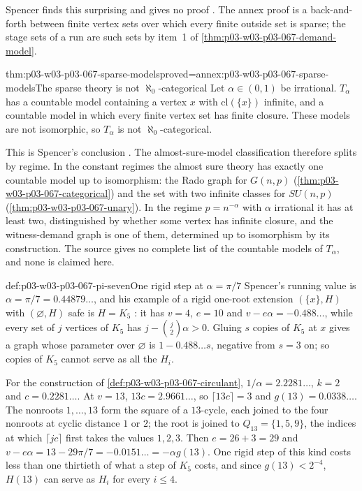 Spencer finds this surprising and gives no proof
\cite[p.~14]{Spencer2007LogicRandomStructuresAuthor}.  The annex proof is a
back-and-forth between finite vertex sets over which every finite outside
set is sparse; the stage sets of a run are such sets by item~1 of
\cref{thm:p03-w03-p03-067-demand-model}.

\begin{hbcorollary}{thm:p03-w03-p03-067-sparse-models}{proved=annex:p03-w03-p03-067-sparse-models}{The sparse theory is not \(\aleph_0\)-categorical}
Let \(\alpha\in(0,1)\) be irrational.  \(T_\alpha\) has a countable model
containing a vertex \(x\) with \(\mathrm{cl}(\{x\})\) infinite, and a
countable model in which every finite vertex set has finite closure.  These
models are not isomorphic, so \(T_\alpha\) is not \(\aleph_0\)-categorical.
\end{hbcorollary}

This is Spencer's conclusion \cite[p.~15]{Spencer2007LogicRandomStructuresAuthor}.
The almost-sure-model classification therefore splits by regime.  In the
constant regimes the almost sure theory has exactly one countable model up
to isomorphism: the Rado graph for \(G(n,p)\)
(\cref{thm:p03-w03-p03-067-categorical}) and the set with two infinite
classes for \(SU(n,p)\) (\cref{thm:p03-w03-p03-067-unary}).  In the regime
\(p=n^{-\alpha}\) with \(\alpha\) irrational it has at least two,
distinguished by whether some vertex has infinite closure, and the
witness-demand graph is one of them, determined up to isomorphism by its
construction.  The source gives no complete list of the countable models of
\(T_\alpha\), and none is claimed here.

\begin{hbexample}{def:p03-w03-p03-067-pi-seven}{One rigid step at \(\alpha=\pi/7\)}
Spencer's running value is \(\alpha=\pi/7=0.44879\ldots\), and his example of
a rigid one-root extension \((\{x\},H)\) with \((\varnothing,H)\) safe is
\(H=K_5\) \cite[p.~14]{Spencer2007LogicRandomStructuresAuthor}: it has
\(v=4\), \(e=10\) and \(v-e\alpha=-0.488\ldots\), while every set of \(j\)
vertices of \(K_5\) has \(j-\binom j2\alpha>0\).  Gluing \(s\) copies of
\(K_5\) at \(x\) gives a graph whose parameter over \(\varnothing\) is
\(1-0.488\ldots s\), negative from \(s=3\) on; so copies of \(K_5\) cannot
serve as all the \(H_i\).

For the construction of \cref{def:p03-w03-p03-067-circulant},
\(1/\alpha=2.2281\ldots\), \(k=2\) and \(c=0.2281\ldots\).  At \(v=13\),
\(13c=2.9661\ldots\), so \(\lceil13c\rceil=3\) and
\(g(13)=0.0338\ldots\).  The nonroots \(1,\ldots,13\) form the square of a
\(13\)-cycle, each joined to the four nonroots at cyclic distance \(1\) or
\(2\); the root is joined to \(Q_{13}=\{1,5,9\}\), the indices at which
\(\lceil jc\rceil\) first takes the values \(1,2,3\).  Then \(e=26+3=29\) and
\(v-e\alpha=13-29\pi/7=-0.0151\ldots=-\alpha g(13)\).  One rigid step of
this kind costs less than one thirtieth of what a step of \(K_5\) costs, and
since \(g(13)<2^{-4}\), \(H(13)\) can serve as \(H_i\) for every
\(i\leq4\).
\end{hbexample}

